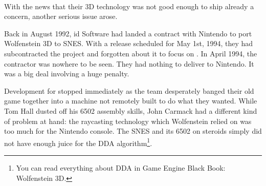 \\
\par
{}%
\label{HUD_screenshot}
\par
With the news that their 3D technology was not good enough to ship already a concern, another serious issue arose.\\
\par
Back in August 1992, id Software had landed a contract with Nintendo to port Wolfenstein 3D to SNES. With a release scheduled for May 1st, 1994, they had subcontracted the project and forgotten about it to focus on \doom. In April 1994, the contractor was nowhere to be seen. They had nothing to deliver to Nintendo. It was a big deal involving a huge penalty.\\
\par
 Development for \doom{} stopped immediately as the team desperately banged their old game together into a machine not remotely built to do what they wanted. While Tom Hall dusted off his 6502 assembly skills, John Carmack had a different kind of problem at hand: the raycasting technology which Wolfenstein relied on was too much for the Nintendo console. The SNES and its 6502 on steroids simply did not have enough juice for the DDA algorithm\footnote{You can read everything about DDA in Game Engine Black Book: Wolfenstein 3D.}.\\%
\par



